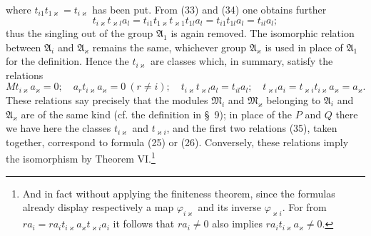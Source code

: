 \documentclass[11pt]{article}
\begin{document}
where $t_{i1}t_{1\varkappa}=t_{i\varkappa}$ has been put. From (33) and (34) one obtains further
\[
 t_{i\varkappa}t_{\varkappa l}a_l=t_{i1}t_{1\varkappa}t_{\varkappa1}t_{1l}a_l
 =t_{i1}t_{1l}a_l=t_{il}a_l;
\]
thus the singling out of the group $\mathfrak A_1$ is again removed. The isomorphic relation between $\mathfrak A_i$ and $\mathfrak A_\varkappa$ remains the same, whichever group $\mathfrak A_\varkappa$ is used in place of $\mathfrak A_1$ for the definition. Hence the $t_{i\varkappa}$ are classes which, in summary, satisfy the relations
\begin{equation}
 Mt_{i\varkappa}a_\varkappa=0;
 \quad a_rt_{i\varkappa}a_\varkappa=0\ (r\ne i);
 \quad t_{i\varkappa}t_{\varkappa l}a_l=t_{il}a_l;
 \quad t_{\varkappa i}a_i=t_{\varkappa i}t_{i\varkappa}a_\varkappa=a_\varkappa.
\tag{35}
\end{equation}
These relations say precisely that the modules $\mathfrak M_i$ and $\mathfrak M_\varkappa$ belonging to $\mathfrak A_i$ and $\mathfrak A_\varkappa$ are of the same kind (cf. the definition in \S~9); in place of the $P$ and $Q$ there we have here the classes $t_{i\varkappa}$ and $t_{\varkappa i}$, and the first two relations (35), taken together, correspond to formula (25) or (26). Conversely, these relations imply the isomorphism by Theorem VI.\footnote{And in fact without applying the finiteness theorem, since the formulas already display respectively a map $\varphi_{i\varkappa}$ and its inverse $\varphi_{\varkappa i}$. For from $ra_i=ra_it_{i\varkappa}a_\varkappa t_{\varkappa i}a_i$ it follows that $ra_i\ne0$ also implies $ra_it_{i\varkappa}a_\varkappa\ne0$.}
\end{document}
